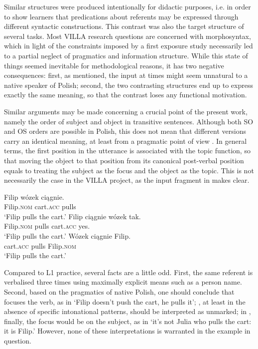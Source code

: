 Similar structures were produced intentionally for didactic purposes, i.e. in order to show learners that predications about referents may be expressed through different syntactic constructions. This contrast was also the target structure of several tasks. Most VILLA research questions are concerned with morphosyntax, which in light of the constraints imposed by a first exposure study necessarily led to a partial neglect of pragmatics and information structure. While this state of things seemed inevitable for methodological reasons, it has two negative consequences: first, as mentioned, the input at times might seem unnatural to a native speaker of Polish; second, the two contrasting structures end up to express exactly the same meaning, so that the contrast loses any functional motivation.

Similar arguments may be made concerning a crucial point of the present work, namely the order of subject and object in transitive sentences. Although both SO and OS orders are possible in Polish, this does not mean that different versions carry an identical meaning, at least from a pragmatic point of view \citep{Siewierska1993}. In general terms, the first position in the utterance is associated with the topic function, so that moving the object to that position from its canonical post-verbal position equals to treating the subject as the focus and the object as the topic. This is not necessarily the case in the VILLA project, as the input fragment in  makes clear.

\ea%
    \label{ex:02:3}
    \ea\label{ex:02:3a}
    \gll    Filip wózek ciągnie.\\
            Filip.\textsc{nom} cart.\textsc{acc} pulls\\
    \glt    ‘Filip pulls the cart.’
    \ex\label{ex:02:3b}
    \gll    Filip ciągnie wózek tak.\\
            Filip.\textsc{nom} pulls cart.\textsc{acc} yes.\\
    \glt    ‘Filip pulls the cart.’
    \ex\label{ex:02:3c}
    \gll    Wózek ciągnie Filip.\\
            cart.\textsc{acc} pulls Filip.\textsc{nom}\\
    \glt    ‘Filip pulls the cart.’
    \z
\z

Compared to L1 practice, several facts are a little odd. First, the same referent is verbalised three times using maximally explicit means such as a person name. Second, based on the pragmatics of native Polish, one should conclude that  focuses the verb, as in ‘Filip doesn't push the cart, he pulls it’; , at least in the absence of specific intonational patterns, should be interpreted as unmarked; in , finally, the focus would be on the subject, as in ‘it's not Julia who pulls the cart: it is Filip.' However, none of these interpretations is warranted in the example in question.

